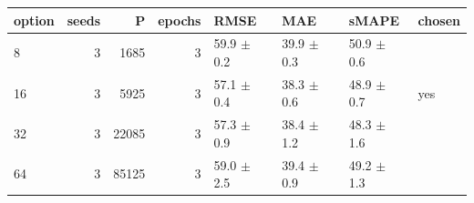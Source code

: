 \begin{tabular}{lrrrllll}
\toprule
option & seeds & P & epochs & RMSE & MAE & sMAPE & chosen \\
\midrule
8 & 3 & 1685 & 3 & 59.9 $\pm$ 0.2 & 39.9 $\pm$ 0.3 & 50.9 $\pm$ 0.6 &  \\
16 & 3 & 5925 & 3 & 57.1 $\pm$ 0.4 & 38.3 $\pm$ 0.6 & 48.9 $\pm$ 0.7 & yes \\
32 & 3 & 22085 & 3 & 57.3 $\pm$ 0.9 & 38.4 $\pm$ 1.2 & 48.3 $\pm$ 1.6 &  \\
64 & 3 & 85125 & 3 & 59.0 $\pm$ 2.5 & 39.4 $\pm$ 0.9 & 49.2 $\pm$ 1.3 &  \\
\bottomrule
\end{tabular}
